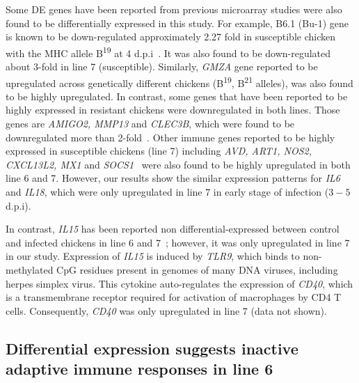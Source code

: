 \documentclass[10pt]{article}
\begin{document}
Some DE genes have been reported from previous microarray studies were also
found to be differentially expressed in this study.  For example, B6.1 (Bu-1)
gene is known to be down-regulated approximately 2.27 fold in susceptible
chicken with the MHC allele B\textsuperscript{19} at 4
d.p.i~\cite{sarson2008transcriptional}.  It was also found to be down-regulated
about 3-fold in line 7 (susceptible).  Similarly, {\em GMZA} gene reported to be
upregulated across genetically different chickens (B\textsuperscript{19},
B\textsuperscript{21} alleles),
was also found to be highly upregulated.  In contrast, some genes that have been
reported to be highly expressed in resistant chickens were downregulated in both
lines. Those genes are {\em AMIGO2, MMP13} and {\em CLEC3B}, which were found to
be downregulated more than 2-fold~\cite{sarson2008transcriptional}.
Other immune genes reported to be highly expressed in susceptible chickens (line
7) including {\em AVD, ART1, NOS2, CXCL13L2, MX1} and {\em
SOCS1}~\cite{smith2011systems} were also found to be highly upregulated in both
line 6 and 7.  However, our results show the similar expression patterns for
{\em IL6} and {\em IL18}, which were only upregulated in line 7 in early stage
of infection ($3-5$ d.p.i).

In contrast, {\em IL15} has been reported non differential-expressed between
control and infected chickens in line 6 and 7~\cite{kaiser2003differential};
however, it was only upregulated in line 7 in our study.  Expression of {\em
IL15} is induced by {\em TLR9}, which binds to non-methylated CpG residues
present in genomes of many DNA viruses, including herpes simplex virus.  This
cytokine auto-regulates the expression of {\em CD40}, which is a transmembrane
receptor required for activation of macrophages by CD4 T cells.  Consequently,
{\em CD40} was only upregulated in line 7 (data not shown).

\subsection*{Differential expression suggests inactive adaptive immune responses
in line 6}
\end{document}
